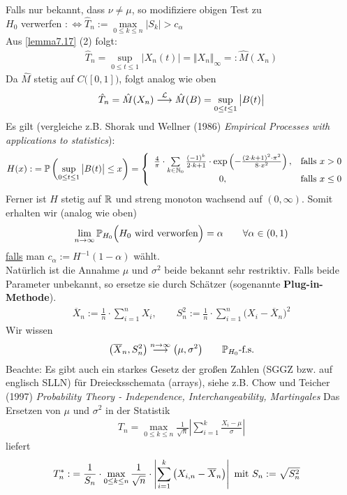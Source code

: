 Falls nur bekannt, dass $\nu\neq\mu$, so modifiziere obigen Test zu\\
$H_0$ verwerfen $:\Longleftrightarrow\hat{T}_n:=\max\limits_{0\leq k\leq n}\big|S_k\big|>c_\alpha$\\
Aus \ref{lemma7.17} (2) folgt:
\begin{align*}
\hat{T}_n=\sup\limits_{0\leq t\leq 1}\big|X_n(t)\big|=\Vert X_n\Vert_\infty=:\hat{M}(X_n)
\end{align*}
Da $\hat{M}$ stetig auf $C\big([0,1]\big)$, folgt analog wie oben
\begin{align*}
\hat{T}_n=\hat{M}(X_n)\stackrel{\L}{\longrightarrow}\hat{M}(B)=\sup\limits_{0\leq t\leq 1}\big|B(t)\big|
\end{align*}
Es gilt (vergleiche z.B. Shorak und Wellner (1986) \textit{Empirical Processes with applications to statistics}):
\begin{align*}
H(x):&=\P\left(\sup\limits_{0\leq t\leq 1}\big|B(t)\big|\leq x\right)
=\left\lbrace\begin{array}{cl}
\frac{4}{\pi}\cdot\sum\limits_{k\in\N_0}\frac{(-1)^k}{2\cdot k+1}\cdot\exp\left(-\frac{(2\cdot k+1)^2\cdot\pi^2}{8\cdot x^2}\right), &\falls x>0\\
0, &\falls x\leq 0
\end{array}\right.
\end{align*}
Ferner ist $H$ stetig auf $\R$ und streng monoton wachsend auf $(0,\infty)$. Somit erhalten wir (analog wie oben)
\begin{align*}
\limn\P_{H_0}\Big(H_0\text{ wird verworfen}\Big)=\alpha\qquad\forall\alpha\in(0,1)
\end{align*}
\ul{falls} man $c_\alpha:=H^{-1}(1-\alpha)$ wählt.\\
Natürlich ist die Annahme $\mu$ und $\sigma^2$ beide bekannt sehr restriktiv. Falls beide Parameter unbekannt, so ersetze sie durch Schätzer (sogenannte \textbf{Plug-in-Methode}).
\begin{align*}
\overline{X}_n:=\frac{1}{n}\cdot\sum\limits_{i=1}^n X_i,\qquad S_n^2:=\frac{1}{n}\cdot\sum\limits_{i=1}^n\big(X_i-\overline{X}_n\big)^2
\end{align*}
Wir wissen
\begin{align*}
\big(\overline{X}_n,S_n^2\big)\stackrel{n\to\infty}{\longrightarrow}\big(\mu,\sigma^2\big)\qquad\P_{H_0}\text{-f.s.}
\end{align*}
Beachte: Es gibt auch ein starkes Gesetz der großen Zahlen (SGGZ bzw. auf englisch SLLN) für Dreiecksschemata (arrays), siehe z.B. Chow und Teicher (1997) \textit{Probability Theory - Independence, Interchangeability, Martingales}\nl
Das Ersetzen von $\mu$ und $\sigma^2$ in der Statistik
\begin{align*}
T_n=\max\limits_{0\leq k\leq n}\frac{1}{\sqrt{n}}\left|\sum\limits_{i=1}^k\frac{X_i-\mu}{\sigma}\right|
\end{align*}
liefert
\begin{align*}
T_n^\ast
:&=\frac{1}{S_n}\cdot\max\limits_{0\leq k\leq n}\frac{1}{\sqrt{n}}\cdot\left|\sum\limits_{i=1}^k \big(X_{i,n}-\overline{X}_n\big)\right|
\mit S_n:=\sqrt{S_n^2}
\end{align*}
